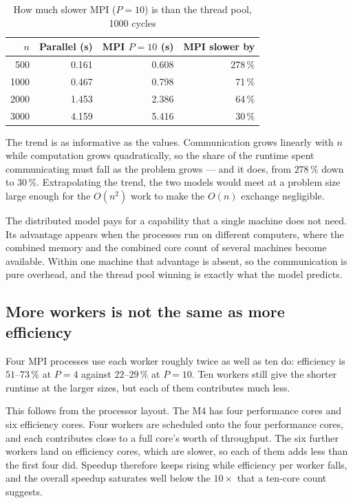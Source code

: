\documentclass[sigconf]{acmart}
\begin{document}
\begin{table}[h]
\centering
\caption{How much slower MPI ($P{=}10$) is than the thread pool, 1000 cycles}
\begin{tabular}{@{}rrrr@{}}
\toprule
$n$ & Parallel (s) & MPI $P{=}10$ (s) & MPI slower by \\
\midrule
500  & 0.161 & 0.608 & 278\,\% \\
1000 & 0.467 & 0.798 & 71\,\% \\
2000 & 1.453 & 2.386 & 64\,\% \\
3000 & 4.159 & 5.416 & 30\,\% \\
\bottomrule
\end{tabular}
\end{table}

The trend is as informative as the values. Communication grows linearly with $n$ while computation
grows quadratically, so the share of the runtime spent communicating must fall as the problem grows
--- and it does, from $278\,\%$ down to $30\,\%$. Extrapolating the trend, the two models would meet
at a problem size large enough for the $O(n^2)$ work to make the $O(n)$ exchange negligible.

The distributed model pays for a capability that a single machine does not need. Its advantage
appears when the processes run on different computers, where the combined memory and the combined
core count of several machines become available. Within one machine that advantage is absent, so the
communication is pure overhead, and the thread pool winning is exactly what the model predicts.

\subsection{More workers is not the same as more efficiency}
\label{sec:workers}

Four MPI processes use each worker roughly twice as well as ten do: efficiency is
$51$--$73\,\%$ at $P = 4$ against $22$--$29\,\%$ at $P = 10$. Ten workers still give the shorter
runtime at the larger sizes, but each of them contributes much less.

This follows from the processor layout. The M4 has four performance cores and six efficiency cores.
Four workers are scheduled onto the four performance cores, and each contributes close to a full
core's worth of throughput. The six further workers land on efficiency cores, which are slower, so
each of them adds less than the first four did. Speedup therefore keeps rising while efficiency per
worker falls, and the overall speedup saturates well below the $10\times$ that a ten-core count
suggests.
\end{document}
